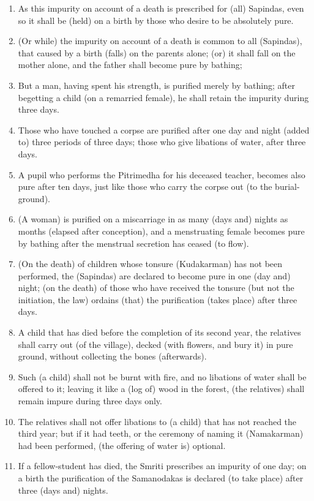 \begin{enumerate}
\item As this impurity on account of a death is prescribed for (all) Sapindas, even so it shall be (held) on a birth by those who desire to be absolutely pure.
\item (Or while) the impurity on account of a death is common to all (Sapindas), that caused by a birth (falls) on the parents alone; (or) it shall fall on the mother alone, and the father shall become pure by bathing;
\item But a man, having spent his strength, is purified merely by bathing; after begetting a child (on a remarried female), he shall retain the impurity during three days.
\item Those who have touched a corpse are purified after one day and night (added to) three periods of three days; those who give libations of water, after three days.
\item A pupil who performs the Pitrimedha for his deceased teacher, becomes also pure after ten days, just like those who carry the corpse out (to the burial-ground).
\item (A woman) is purified on a miscarriage in as many (days and) nights as months (elapsed after conception), and a menstruating female becomes pure by bathing after the menstrual secretion has ceased (to flow).
\item (On the death) of children whose tonsure (Kudakarman) has not been performed, the (Sapindas) are declared to become pure in one (day and) night; (on the death) of those who have received the tonsure (but not the initiation, the law) ordains (that) the purification (takes place) after three days.
\item A child that has died before the completion of its second year, the relatives shall carry out (of the village), decked (with flowers, and bury it) in pure ground, without collecting the bones (afterwards).
\item Such (a child) shall not be burnt with fire, and no libations of water shall be offered to it; leaving it like a (log of) wood in the forest, (the relatives) shall remain impure during three days only.
\item The relatives shall not offer libations to (a child) that has not reached the third year; but if it had teeth, or the ceremony of naming it (Namakarman) had been performed, (the offering of water is) optional.
\item If a fellow-student has died, the Smriti prescribes an impurity of one day; on a birth the purification of the Samanodakas is declared (to take place) after three (days and) nights.

\end{enumerate}

